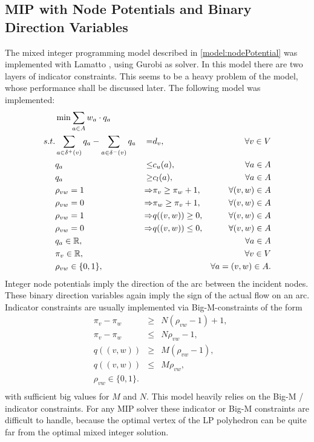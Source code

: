 \subsection{MIP with Node Potentials and Binary Direction Variables}
The mixed integer programming model described in \ref{model:nodePotential} was implemented with Lamatto \cite{lamatto}, 
using Gurobi \cite{gurobi} as solver. In this model there are two layers of indicator constraints. This seems to be a 
heavy problem of the model, whose performance shall be discussed later. The following model was implemented:
\begin{align*}
  &\min \sum_{a\in A} w_a\cdot q_a & \\
 s.t. & \sum_{a\in \delta^+(v)}q_a - \sum_{a\in\delta^- (v)}q_a &=& d_v, &\forall v\in V \\
 & q_a &\le& c_u(a),& \forall a\in A\\
 & q_a &\ge& c_l(a), & \forall a\in A\\
 & \rho_{vw}=1 &\Rightarrow &\pi_v\ge\pi_w +1, & \forall (v,w)\in A\\
 & \rho_{vw}=0 &\Rightarrow &\pi_w\ge\pi_v +1,& \forall (v,w)\in A\\
 & \rho_{vw}=1 &\Rightarrow &q((v,w))\ge 0,& \forall (v,w)\in A\\
 & \rho_{vw}=0 &\Rightarrow &q((v,w))\le 0,& \forall (v,w)\in A\\
 & q_a \in \mathbb{R}, & & &\forall a\in A\\
 & \pi_v \in \mathbb{R}, & & & \forall v\in V\\
 & \rho_{vw} \in \{0,1\},&&& \forall a=(v,w)\in A.\\
\end{align*}
Integer node potentials imply the direction of the arc between the incident nodes. These binary direction 
variables again imply the sign of the actual flow on an arc. Indicator constraints are usually implemented via 
Big-M-constraints of the form 
\begin{align*}
 &\pi_v-\pi_w &\ge & N(\rho_{vw}-1)+1,\\
 &\pi_v-\pi_w&\le &N\rho_{vw}-1, \\
 &q((v,w))&\ge& M(\rho_{vw}-1),\\
 &q((v,w))&\le & M\rho_{vw},\\
 &\rho_{vw} \in \{0,1\}.&&\\
\end{align*}
with sufficient big values for $M$ and $N$. This model heavily relies on the Big-M / indicator constraints.
For any MIP solver these indicator or Big-M constraints are difficult to handle, because the optimal vertex of the LP 
polyhedron can be quite far from the optimal mixed integer solution.\\

